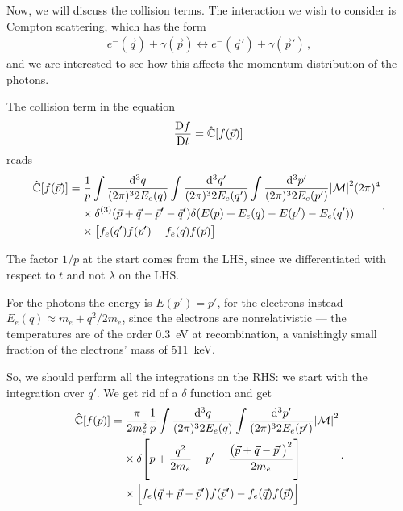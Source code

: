 \documentclass[main.tex]{subfiles}
\begin{document}

Now, we will discuss the collision terms. 
The interaction we wish to consider is Compton scattering, which has the form 
%
\begin{align}
e^{-} (\vec{q}) + \gamma (\vec{p})
\leftrightarrow
e^{-} (\vec{q}') + \gamma (\vec{p}')
\,,
\end{align}
%
and we are interested to see how this affects the momentum distribution of the photons. 

The collision term in the equation 
%
\begin{align}
\frac{\mathrm{D} f}{\mathrm{D} t} = \hat{\mathbb{C}} [f(\vec{p})] 
\,
\end{align}
%
reads 
%
\begin{subequations}
\begin{align}
\begin{split}
\hat{\mathbb{C}} [f(\vec{p})] &= \frac{1}{p} 
\int \frac{ \dd[3]{q}}{(2\pi)^3 2 E_e (q)}
\int \frac{ \dd[3]{q'}}{(2\pi)^3 2 E_e (q')}
\int \frac{ \dd[3]{p'}}{(2\pi)^3 2 E_e (p')} 
\abs{\mathcal{M}}^2 (2 \pi )^{4} \\
&\phantom{=}\ 
\times \delta^{(3)} (\vec{p} + \vec{q} - \vec{p}' - \vec{q}')
\delta (E(p) + E_e(q) - E(p') - E_e (q')) \\
&\phantom{=}\ 
\times \qty[f_e (\vec{q}') f(\vec{p}') - f_e(\vec{q}) f(\vec{p})]
\end{split}
\,.
\end{align}
\end{subequations}

The factor \(1/p\) at the start comes from the LHS, since we differentiated with respect to \(t\) and not \(\lambda \) on the LHS. 

For the photons the energy is \(E(p') = p'\), for the electrons  instead \(E_e (q) \approx m_e + q^2  /2m_e\), since the electrons are nonrelativistic --- the temperatures are of the order \SI{.3}{eV} at recombination, a vanishingly small fraction of the electrons' mass of \SI{511}{keV}. 

So, we should perform all the integrations on the RHS: we start with the integration over \(q'\). We get rid of a \(\delta \) function and get 
%
\begin{subequations}
\begin{align}
\begin{split}
\hat{\mathbb{C}} [f(\vec{p})] &= \frac{\pi}{2 m_e^2}
 \frac{1}{p} 
\int \frac{ \dd[3]{q}}{(2\pi)^3 2 E_e (q)}
\int \frac{ \dd[3]{p'}}{(2\pi)^3 2 E_e (p')} 
\abs{\mathcal{M}}^2 \\
&\phantom{=}\ 
\times \delta \qty[p + \frac{q^2}{2 m_e} - p' - \frac{\qty(\vec{p}+ \vec{q} - \vec{p}')^2}{2m_e}] \\
&\phantom{=}\ 
\times \qty[f_e \qty(\vec{q} + \vec{p} - \vec{p}') f(\vec{p}')
- f_e (\vec{q}) f(\vec{p})]
\end{split}
  \,.
\end{align}
\end{subequations}
\end{document}

